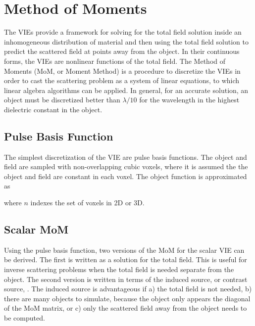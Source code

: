 {\footnotesize
{}
}

\clearpage
\newpage


\section{Method of Moments}

The VIEs provide a framework for solving for the total field solution inside an inhomogeneous distribution of material and then using the total field solution to predict the scattered field at points away from the object. In their continuous forms, the VIEs are nonlinear functions of the total field. The Method of Moments (MoM, or Moment Method) is a procedure to discretize the VIEs in order to cast the scattering problem as a system of linear equations, to which linear algebra algorithms can be applied. In general, for an accurate solution, an object must be discretized better than $\lambda/10$ for the wavelength in the highest dielectric constant in the object. 

\subsection{Pulse Basis Function}
The simplest discretization of the VIE are pulse basis functions. The object and field are sampled with non-overlapping cubic voxels, where it is assumed the the object and field are constant in each voxel. The object function is approximated as 

\noindent where $n$ indexes the set of voxels in 2D or 3D.  

\subsection{Scalar MoM} 

Using the pulse basis function, two versions of the MoM for the scalar VIE can be derived. The first is written as a solution for the total field. This is useful for inverse scattering problems when the total field is needed separate from the object.  The second version is written in terms of the induced source, or contrast source, \cite{van1997contrast}. The induced source is advantageous if a) the total field is not needed, b) there are many objects to simulate, because  the object only appears the diagonal of the MoM matrix, or c) only the scattered field away from the object needs to be computed.


